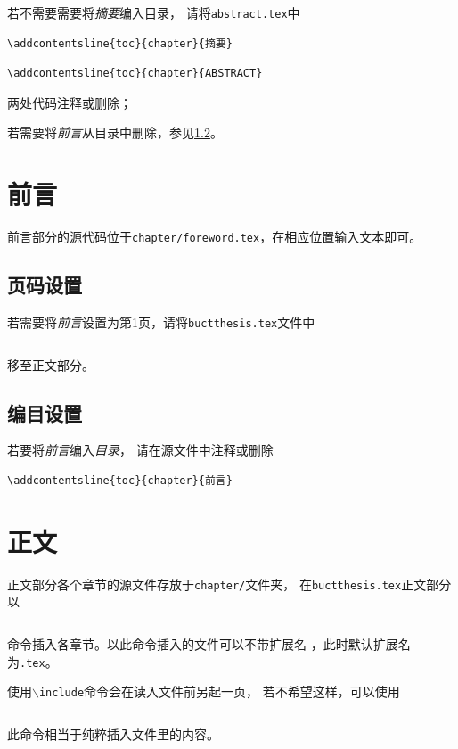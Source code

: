     若不需要需要将\emph{摘要}编入目录，
    请将\texttt{abstract.tex}中

	\begin{lstlisting}
\addcontentsline{toc}{chapter}{摘要}
    \end{lstlisting}
    
	\begin{lstlisting}
\addcontentsline{toc}{chapter}{ABSTRACT}
	\end{lstlisting}
    两处代码注释或删除；
    
    若需要将\emph{前言}从目录中删除，参见\ref{subsec:fwtoc}。
    
    
\section{前言}\label{sec:foreword}
	前言部分的源代码位于\texttt{chapter/foreword.tex}，在相应位置输入文本即可。
    \subsection{页码设置}\label{subsec:fwpage}
    若需要将\emph{前言}设置为第1页，请将\texttt{buctthesis.tex}文件中

    \begin{lstlisting}[firstnumber=61]

    \end{lstlisting}
    移至正文部分。
    \subsection{编目设置}\label{subsec:fwtoc}
    若要将\emph{前言}编入\emph{目录}，
    请在源文件中注释或删除
    \begin{lstlisting}[firstnumber=3]
\addcontentsline{toc}{chapter}{前言}
    \end{lstlisting}

\section{正文}
正文部分各个章节的源文件存放于\texttt{chapter/}文件夹，
在\texttt{buctthesis.tex}正文部分以

\begin{lstlisting}

\end{lstlisting}
命令插入各章节。以此命令插入的文件可以不带扩展名
，此时默认扩展名为\texttt{.tex}。

使用\texttt{$\backslash$include}命令会在读入文件前另起一页，
若不希望这样，可以使用
\begin{lstlisting}

\end{lstlisting}
此命令相当于纯粹插入文件里的内容。
